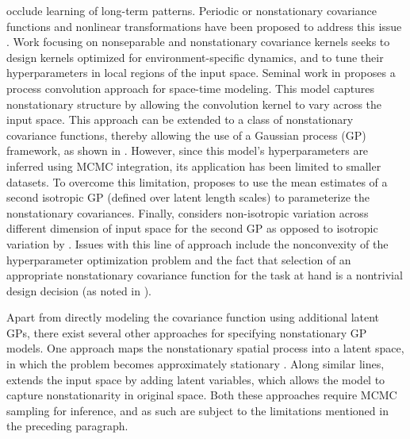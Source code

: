 occlude learning of long-term patterns.  Periodic or nonstationary covariance functions and nonlinear transformations have been proposed to address this issue \cite{ma2003nonstationary,RasmussenWilliams2005}. Work focusing on nonseparable and nonstationary covariance kernels seeks to design kernels optimized for environment-specific dynamics, and to tune their hyperparameters in local regions of the input space. Seminal work in \cite{higdon1998process} proposes a process convolution approach for space-time modeling. This model captures nonstationary structure by allowing the convolution kernel to vary across the input space. This approach can be extended to a class of nonstationary covariance functions, thereby allowing the use of a Gaussian process (GP) framework, as shown in \cite{paciorek2004nonstationary}. However,  since this model's hyperparameters are inferred using MCMC integration, its application has been limited to smaller datasets. To overcome this limitation, \cite{plagemann2008nonstationary} proposes to use the mean estimates of a second isotropic GP (defined over latent length scales) to parameterize the nonstationary covariances. Finally, \cite{garg2012AAAI} considers non-isotropic variation across different dimension of input space for the second GP as opposed to isotropic variation by \cite{plagemann2008nonstationary}. Issues with this line of approach include the nonconvexity of the hyperparameter optimization problem and the fact that selection of an appropriate nonstationary covariance function for the task at hand is a nontrivial design decision (as noted in \cite{singh2010modeling}). 

Apart from directly modeling the covariance function using additional latent GPs, there exist several other approaches for specifying nonstationary GP models. One approach maps the nonstationary spatial process into a latent space, in which the problem becomes approximately stationary \cite{schmidt2003bayesian}. Along similar lines, \cite{pfingsten2006nonstationary} extends the input space by adding latent variables, which allows the model to capture  nonstationarity in original space. Both these approaches require MCMC sampling for inference, and as such are subject to the limitations mentioned in the preceding paragraph. 

